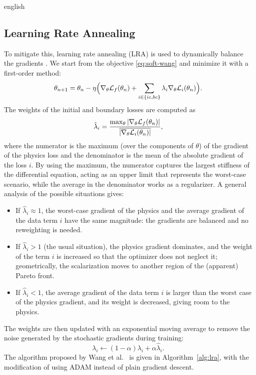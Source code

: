 \begin{hyphenrules}{english}
\subsection{Learning Rate Annealing}\label{subsec:lra}

To mitigate this, learning rate annealing (LRA) is used to dynamically balance the gradients
\cite{wang2021gradient}. We start from the objective \eqref{eq:soft-wang} and minimize it with a
first-order method:
\begin{equation}
  \theta_{n+1}=\theta_n-\eta\Big(\nabla_\theta\mathcal{L}_f(\theta_n)+\sum_{i\in\{ic,bc\}}\lambda_i\nabla_\theta\mathcal{L}_i(\theta_n)\Big).
  \label{eq:lra-update}
\end{equation}
The weights of the initial and boundary losses are computed as
\begin{equation}
  \hat\lambda_i=\frac{\max_\theta\left\lvert \nabla_\theta\mathcal{L}_f(\theta_n) \right\rvert}{\overline{\left\lvert \nabla_\theta\mathcal{L}_i(\theta_n) \right\rvert}},
  \label{eq:lra-weights}
\end{equation}
where the numerator is the maximum (over the components of $\theta$) of the gradient of the physics loss
and the denominator is the mean of the absolute gradient of the loss $i$. By using the maximum, the numerator
captures the largest stiffness of the differential equation, acting as an upper limit that represents the
worst-case scenario, while the average in the denominator works as a regularizer. A general analysis of
the possible situations gives:
\begin{itemize}
  \item If $\hat\lambda_i\approx1$, the worst-case gradient of the physics and the average gradient of
    the data term $i$ have the same magnitude: the gradients are balanced and no reweighting is needed.
  \item If $\hat\lambda_i>1$ (the usual situation), the physics gradient dominates, and the weight of
    the term $i$ is increased so that the optimizer does not neglect it; geometrically, the
    scalarization moves to another region of the (apparent) Pareto front.
  \item If $\hat\lambda_i<1$, the average gradient of the data term $i$ is larger than the worst case of
    the physics gradient, and its weight is decreased, giving room to the physics.
\end{itemize}
The weights are then updated with an exponential moving average to remove the noise generated by the
stochastic gradients during training:
\begin{equation}
  \lambda_i\leftarrow(1-\alpha)\lambda_i+\alpha\hat\lambda_i.
  \label{eq:lra-ema}
\end{equation}
The algorithm proposed by Wang et al.~\cite{wang2021gradient} is given in Algorithm~\ref{alg:lra}, with the modification
of using ADAM instead of plain gradient descent.


\end{hyphenrules}
